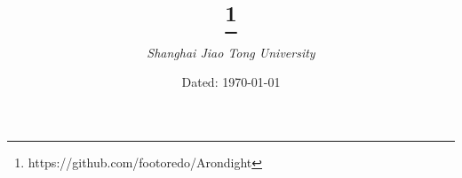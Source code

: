 \documentclass[landscape, oneside, a4paper, cs4size]{book}
\begin{document}
\scriptsize
	\renewcommand{\thefootnote}{\fnsymbol{footnote}}
	\title{\Huge{}\thanks{https://github.com/footoredo/Arondight}}
	\author{\emph{Shanghai Jiao Tong University}}
	\date{Dated: \today}
	\maketitle
	\clearpage
	\begin{multicols}{2}
		\tableofcontents
		\clearpage
		\begin{spacing}{0.8}
			
		\end{spacing}
	\end{multicols}
\end{document}

